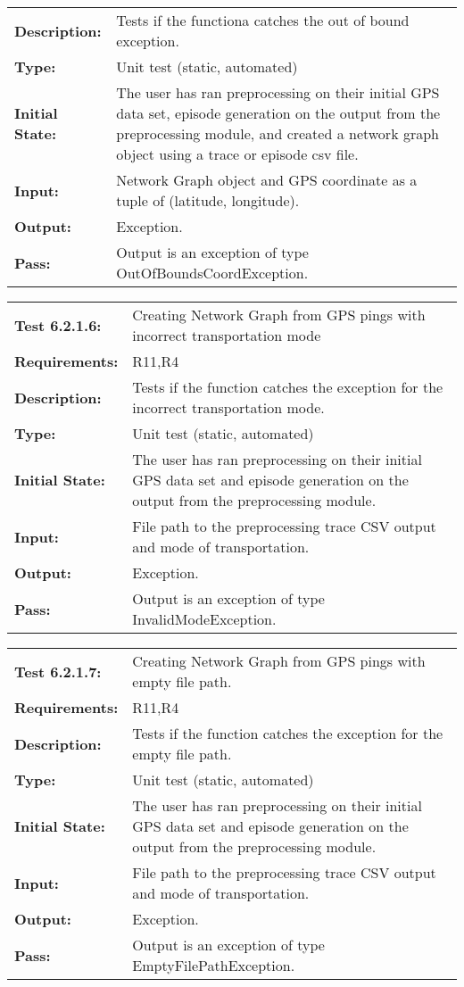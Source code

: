 \documentclass[12pt, titlepage]{article}
\begin{document}
{\begin{tabular}{|l|p{10cm}|}
    \bf{Description}: & Tests if the functiona catches the out of bound exception. \\
    \bf{Type}: & Unit test (static, automated) \\
    \bf{Initial State}: & The user has ran preprocessing on their initial GPS data set, episode generation on the output from the preprocessing module, and created a network graph object using a trace or episode csv file. \\
    \bf{Input}: & Network Graph object and GPS coordinate as a tuple of (latitude, longitude). \\
    \bf{Output}: & Exception. \\
    \bf{Pass}: & Output is an exception of type OutOfBoundsCoordException. \\
    \hline
\end{tabular}
\begin{tabular}{|l|p{10cm}|}
    \hline
    \bf{Test} 6.2.1.6: & Creating Network Graph from GPS pings with incorrect transportation mode \\
    \bf{Requirements}: &  R11,R4\\
    \bf{Description}: & Tests if the function catches the exception for the incorrect transportation mode. \\
    \bf{Type}: & Unit test (static, automated) \\
    \bf{Initial State}: & The user has ran preprocessing on their initial GPS data set and episode generation on the output from the preprocessing module. \\
    \bf{Input}: & File path to the preprocessing trace CSV output and mode of transportation. \\
    \bf{Output}: & Exception. \\
    \bf{Pass}: & Output is an exception of type InvalidModeException. \\
    \hline
\end{tabular}
\begin{tabular}{|l|p{10cm}|}
    \hline
    \bf{Test} 6.2.1.7: & Creating Network Graph from GPS pings with empty file path. \\
    \bf{Requirements}: & R11,R4 \\
    \bf{Description}: & Tests if the function catches the exception for the empty file path. \\
    \bf{Type}: & Unit test (static, automated) \\
    \bf{Initial State}: & The user has ran preprocessing on their initial GPS data set and episode generation on the output from the preprocessing module. \\
    \bf{Input}: & File path to the preprocessing trace CSV output and mode of transportation. \\
    \bf{Output}: & Exception. \\
    \bf{Pass}: & Output is an exception of type EmptyFilePathException. \\
    \hline
\end{tabular}
}
\end{document}
